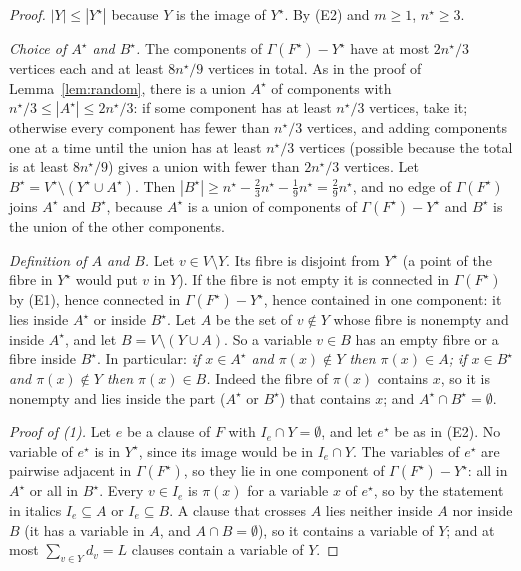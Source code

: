 \documentclass[11pt,a4paper]{article}
\theoremstyle{definition}
\theoremstyle{remark}
\newcommand{\Gr}{\Gamma}
\begin{document}
\begin{proof}
$|Y|\le|Y^\star|$ because $Y$ is the image of $Y^\star$. By (E2) and $m\ge1$, $n^\star\ge3$.

\emph{Choice of $A^\star$ and $B^\star$.} The components of $\Gr(F^\star)-Y^\star$ have at
most $2n^\star/3$ vertices each and at least $8n^\star/9$ vertices in total. As in the proof
of Lemma~\ref{lem:random}, there is a union $A^\star$ of components with
$n^\star/3\le|A^\star|\le2n^\star/3$: if some component has at least $n^\star/3$ vertices,
take it; otherwise every component has fewer than $n^\star/3$ vertices, and adding
components one at a time until the union has at least $n^\star/3$ vertices (possible because
the total is at least $8n^\star/9$) gives a union with fewer than $2n^\star/3$ vertices. Let
$B^\star=V^\star\setminus(Y^\star\cup A^\star)$. Then
$|B^\star|\ge n^\star-\frac23n^\star-\frac19n^\star=\frac29n^\star$, and no edge of
$\Gr(F^\star)$ joins $A^\star$ and $B^\star$, because $A^\star$ is a union of components of
$\Gr(F^\star)-Y^\star$ and $B^\star$ is the union of the other components.

\emph{Definition of $A$ and $B$.} Let $v\in V\setminus Y$. Its fibre is disjoint from
$Y^\star$ (a point of the fibre in $Y^\star$ would put $v$ in $Y$). If the fibre is not
empty it is connected in $\Gr(F^\star)$ by (E1), hence connected in $\Gr(F^\star)-Y^\star$,
hence contained in one component: it lies inside $A^\star$ or inside $B^\star$. Let $A$ be
the set of $v\notin Y$ whose fibre is nonempty and inside $A^\star$, and let
$B=V\setminus(Y\cup A)$. So a variable $v\in B$ has an empty fibre or a fibre inside
$B^\star$. In particular: \emph{if $x\in A^\star$ and $\pi(x)\notin Y$ then $\pi(x)\in A$;
if $x\in B^\star$ and $\pi(x)\notin Y$ then $\pi(x)\in B$.} Indeed the fibre of $\pi(x)$
contains $x$, so it is nonempty and lies inside the part ($A^\star$ or $B^\star$) that
contains $x$; and $A^\star\cap B^\star=\emptyset$.

\emph{Proof of (1).} Let $e$ be a clause of $F$ with $I_e\cap Y=\emptyset$, and let
$e^\star$ be as in (E2). No variable of $e^\star$ is in $Y^\star$, since its image would be
in $I_e\cap Y$. The variables of $e^\star$ are pairwise adjacent in $\Gr(F^\star)$, so they
lie in one component of $\Gr(F^\star)-Y^\star$: all in $A^\star$ or all in $B^\star$. Every
$v\in I_e$ is $\pi(x)$ for a variable $x$ of $e^\star$, so by the statement in italics
$I_e\subseteq A$ or $I_e\subseteq B$. A clause that crosses $A$ lies neither inside $A$ nor
inside $B$ (it has a variable in $A$, and $A\cap B=\emptyset$), so it contains a variable of
$Y$; and at most $\sum_{v\in Y}d_v=L$ clauses contain a variable of $Y$.


\end{proof}
\end{document}
